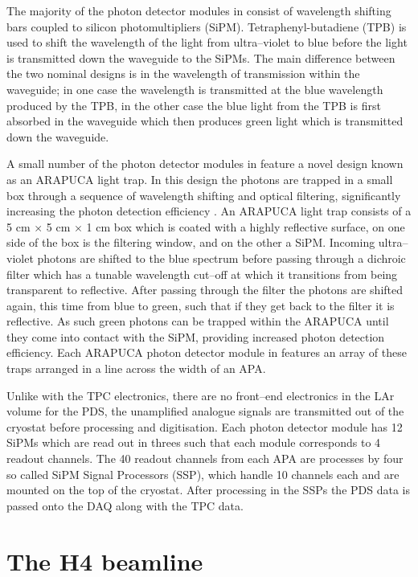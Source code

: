 The majority of the photon detector modules in \protodune{} consist of 
wavelength shifting bars coupled to silicon photomultipliers (SiPM). 
Tetraphenyl-butadiene (TPB) is used to shift the wavelength of the light 
from ultra--violet to blue before the light is transmitted down the waveguide to
the SiPMs. The main difference between the two nominal designs is in the 
wavelength of transmission within the waveguide; in one case the wavelength is 
transmitted at the blue wavelength produced by the TPB, in the other case the 
blue light from the TPB is first absorbed in the waveguide which then produces 
green light which is transmitted down the waveguide.

A small number of the photon detector modules in \protodune{} feature a novel 
design known as an ARAPUCA light trap. In this design the photons are trapped 
in a small box through a sequence of wavelength shifting and optical 
filtering, significantly increasing the photon detection efficiency 
\cite{Segreto:2018jdx}. An ARAPUCA light trap consists of a 5 cm $\times$ 5 cm 
$\times$ 1 cm box which is coated with a highly reflective surface, on one 
side of the box is the filtering window, and on the other a SiPM. Incoming 
ultra--violet photons are shifted to the blue spectrum before passing through 
a dichroic filter which has a tunable wavelength cut--off at which it 
transitions from being transparent to reflective. After passing through the 
filter the photons are shifted again, this time from blue to green, such that 
if they get back to the filter it is reflective. As such green photons can 
be trapped within the ARAPUCA until they come into contact with the SiPM, 
providing increased photon detection efficiency. Each ARAPUCA photon detector 
module in \protodune{} features an array of these traps arranged in a line 
across the width of an APA.

Unlike with the TPC electronics, there are no front--end electronics in the LAr
volume for the PDS, the unamplified analogue signals are transmitted out of the
cryostat before processing and digitisation. Each photon detector module has 
12 SiPMs which are read out in threes such that each module corresponds to 4 
readout channels. The 40 readout channels from each APA are processes by four 
so called SiPM Signal Processors (SSP), which handle 10 channels each and are 
mounted on the top of the cryostat. After processing in the SSPs the PDS data is
passed onto the DAQ along with the TPC data.

\section{The H4 beamline} \label{sec:h4}

